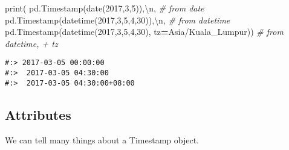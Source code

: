 \documentclass[
]{book}
\newenvironment{Shaded}{\begin{snugshade}}{\end{snugshade}}
\newcommand{\BuiltInTok}[1]{#1}
\newcommand{\CharTok}[1]{\textcolor[rgb]{0.5,0.5,0.5}{#1}}
\newcommand{\CommentTok}[1]{\textcolor[rgb]{0.37,0.37,0.37}{\textit{#1}}}
\newcommand{\DecValTok}[1]{\textcolor[rgb]{0.06,0.06,0.06}{#1}}
\newcommand{\NormalTok}[1]{#1}
\newcommand{\OperatorTok}[1]{\textcolor[rgb]{0.43,0.43,0.43}{\textbf{#1}}}
\newcommand{\StringTok}[1]{\textcolor[rgb]{0.5,0.5,0.5}{#1}}
\begin{document}
\begin{Shaded}
\begin{Highlighting}[]
\BuiltInTok{print}\NormalTok{( pd.Timestamp(date(}\DecValTok{2017}\NormalTok{,}\DecValTok{3}\NormalTok{,}\DecValTok{5}\NormalTok{)),}\StringTok{\textquotesingle{}}\CharTok{\textbackslash{}n}\StringTok{\textquotesingle{}}\NormalTok{,           }\CommentTok{\# from date}
\NormalTok{       pd.Timestamp(datetime(}\DecValTok{2017}\NormalTok{,}\DecValTok{3}\NormalTok{,}\DecValTok{5}\NormalTok{,}\DecValTok{4}\NormalTok{,}\DecValTok{30}\NormalTok{)),}\StringTok{\textquotesingle{}}\CharTok{\textbackslash{}n}\StringTok{\textquotesingle{}}\NormalTok{,  }\CommentTok{\# from datetime}
\NormalTok{       pd.Timestamp(datetime(}\DecValTok{2017}\NormalTok{,}\DecValTok{3}\NormalTok{,}\DecValTok{5}\NormalTok{,}\DecValTok{4}\NormalTok{,}\DecValTok{30}\NormalTok{), tz}\OperatorTok{=}\StringTok{\textquotesingle{}Asia/Kuala\_Lumpur\textquotesingle{}}\NormalTok{)) }\CommentTok{\# from datetime, + tz}
\end{Highlighting}
\end{Shaded}

\begin{verbatim}
#:> 2017-03-05 00:00:00 
#:>  2017-03-05 04:30:00 
#:>  2017-03-05 04:30:00+08:00
\end{verbatim}

\hypertarget{attributes-4}{%
\subsection{Attributes}\label{attributes-4}}

We can tell many things about a Timestamp object.
\end{document}
